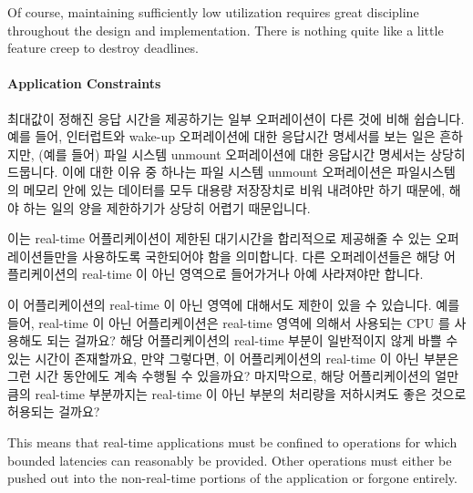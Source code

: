 Of course, maintaining sufficiently low utilization requires great
discipline throughout the design and implementation.
There is nothing quite like a little feature creep to destroy deadlines.
\fi

\paragraph{Application Constraints}
\label{sec:advsync:Application Constraints}

최대값이 정해진 응답 시간을 제공하기는 일부 오퍼레이션이 다른 것에 비해
쉽습니다.
예를 들어, 인터럽트와 wake-up 오퍼레이션에 대한 응답시간 명세서를 보는 일은
흔하지만, (예를 들어) 파일 시스템 unmount 오퍼레이션에 대한 응답시간 명세서는
상당히 드뭅니다.
이에 대한 이유 중 하나는 파일 시스템 unmount 오퍼레이션은 파일시스템의 메모리
안에 있는 데이터를 모두 대용량 저장장치로 비워 내려야만 하기 때문에, 해야 하는
일의 양을 제한하기가 상당히 어렵기 때문입니다.

이는 real-time 어플리케이션이 제한된 대기시간을 합리적으로 제공해줄 수 있는
오퍼레이션들만을 사용하도록 국한되어야 함을 의미합니다.
다른 오퍼레이션들은 해당 어플리케이션의 real-time 이 아닌 영역으로 들어가거나
아예 사라져야만 합니다.

이 어플리케이션의 real-time 이 아닌 영역에 대해서도 제한이 있을 수 있습니다.
예를 들어, real-time 이 아닌 어플리케이션은 real-time 영역에 의해서 사용되는
CPU 를 사용해도 되는 걸까요?
해당 어플리케이션의 real-time 부분이 일반적이지 않게 바쁠 수 있는 시간이
존재할까요, 만약 그렇다면, 이 어플리케이션의 real-time 이 아닌 부분은 그런 시간
동안에도 계속 수행될 수 있을까요?
마지막으로, 해당 어플리케이션의 얼만큼의 real-time 부분까지는 real-time 이 아닌
부분의 처리량을 저하시켜도 좋은 것으로 허용되는 걸까요?
\iffalse

This means that real-time applications must be confined to operations
for which bounded latencies can reasonably be provided.
Other operations must either be pushed out into the non-real-time portions
of the application or forgone entirely.

